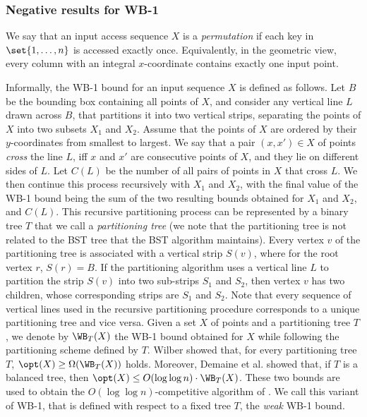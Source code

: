 \documentclass[11pt]{article}
\numberwithin{equation}{section}
\theoremstyle{definition}
\theoremstyle{plain}
\begin{document}
\subsubsection{Negative results for WB-1}

We say that an input access sequence $X$ is a \emph{permutation} if each key in $\set{1,\ldots,n}$ is accessed exactly
once. Equivalently, in the geometric view, every column with an integral $x$-coordinate contains exactly one input point.

Informally, the WB-1 bound for an input sequence $X$ is defined as follows. Let $B$ be the bounding box containing all points of $X$, and consider any vertical line $L$ drawn across $B$, that partitions it into two vertical strips, separating the points of $X$ into two subsets $X_{1}$
and $X_{2}$. Assume that the points of $X$ are ordered by their $y$-coordinates from smallest to largest. We say that a pair $(x,x')\in X$ of points \emph{cross} the line $L$, iff $x$ and $x'$ are consecutive points of $X$, and they lie on different sides of $L$. Let $C(L)$ be the number of all pairs of points in $X$ that cross $L$. We then continue this process recursively with $X_1$ and $X_2$, with the final value of the WB-1 bound being the sum of the two resulting bounds obtained for $X_1$ and $X_2$, and $C(L)$.
This recursive partitioning process can be represented by a binary tree $T$ that
we call a \emph{partitioning tree} (we note that the partitioning tree is not related to the BST tree that the BST algorithm maintains). 
Every vertex $v$ of the partitioning tree is associated with a vertical strip $S(v)$, where for the root vertex $r$, $S(r)=B$. If the partitioning algorithm uses a vertical line $L$ to partition the strip $S(v)$ into two sub-strips $S_1$ and $S_2$, then vertex $v$ has two children, whose corresponding strips are $S_1$ and $S_2$. Note that every sequence of vertical lines used in the recursive partitioning procedure corresponds to a unique partitioning tree and vice versa. 
Given a set  $X$ of points and a partitioning tree $T$, we denote  by $\WB_{T}(X)$ the WB-1 bound obtained for $X$ while following the partitioning scheme defined by $T$. Wilber \cite{wilber}
showed that, for every partitioning tree $T$, $\opt(X)\geq \Omega(\WB_{T}(X))$ holds. Moreover,  Demaine et al. \cite{tango} showed that, if $T$ is a balanced tree, then $\opt(X)\le O(\log\log n)\cdot \WB_{T}(X)$. These two bounds are used to obtain the $O(\log\log n)$-competitive algorithm of \cite{tango}. We call this variant of WB-1, that is defined with respect to a fixed tree $T$, the \emph{weak} WB-1 bound. 
\end{document}
